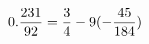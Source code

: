 \documentclass[preview]{standalone}
\begin{document}
\begin{align*}
\special{dvisvgm:raw <g id='unique000'>}0. \frac{231}{92} = \frac{3}{4} - 9(- \frac{45}{184})\special{dvisvgm:raw </g>}
\end{align*}
\end{document}
